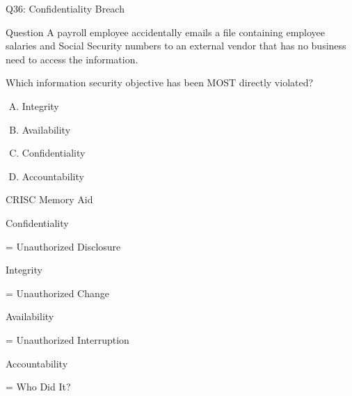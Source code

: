 \documentclass{beamer}
\begin{document}
	
	\begin{frame}{Q36: Confidentiality Breach}
		\begin{block}{Question}
			A payroll employee accidentally emails a file containing employee
			salaries and Social Security numbers to an external vendor that
			has no business need to access the information.
			
			Which information security objective has been MOST directly violated?
		\end{block}
		
		\begin{enumerate}[(A)]
			\item Integrity
			\item Availability
			\item Confidentiality
			\item Accountability
		\end{enumerate}
		
				\begin{block}{CRISC Memory Aid}
			
			Confidentiality
			
			= Unauthorized Disclosure
			
			\vspace{0.1cm}
			
			Integrity
			
			= Unauthorized Change
			
			\vspace{0.1cm}
			
			Availability
			
			= Unauthorized Interruption
			
			\vspace{0.1cm}
			
			Accountability
			
			= Who Did It?
			
		\end{block}
	\end{frame}
	
\end{document}
